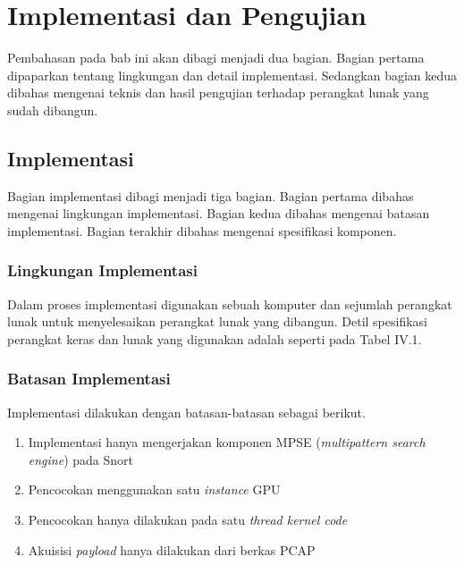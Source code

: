 
\chapter{Implementasi dan Pengujian}

Pembahasan pada bab ini akan dibagi menjadi dua bagian. Bagian pertama dipaparkan tentang lingkungan dan detail implementasi. Sedangkan bagian kedua dibahas mengenai teknis dan hasil pengujian terhadap perangkat lunak yang sudah dibangun.

\section{Implementasi}

  Bagian implementasi dibagi menjadi tiga bagian. Bagian pertama dibahas mengenai lingkungan implementasi. Bagian kedua dibahas mengenai batasan implementasi. Bagian terakhir dibahas mengenai spesifikasi komponen.

  \subsection{Lingkungan Implementasi}

    Dalam proses implementasi digunakan sebuah komputer dan sejumlah perangkat lunak untuk menyelesaikan perangkat lunak yang dibangun. Detil spesifikasi perangkat keras dan lunak yang digunakan adalah seperti pada Tabel IV.1.
    
    

  \subsection{Batasan Implementasi}

    Implementasi dilakukan dengan batasan-batasan sebagai berikut.

    \begin{enumerate}

      \item Implementasi hanya mengerjakan komponen MPSE (\emph{multipattern search engine}) pada Snort

      \item Pencocokan menggunakan satu \emph{instance} GPU
    
      \item Pencocokan hanya dilakukan pada satu \emph{thread kernel code}
    
      \item Akuisisi \emph{payload} hanya dilakukan dari berkas PCAP

    \end{enumerate}

